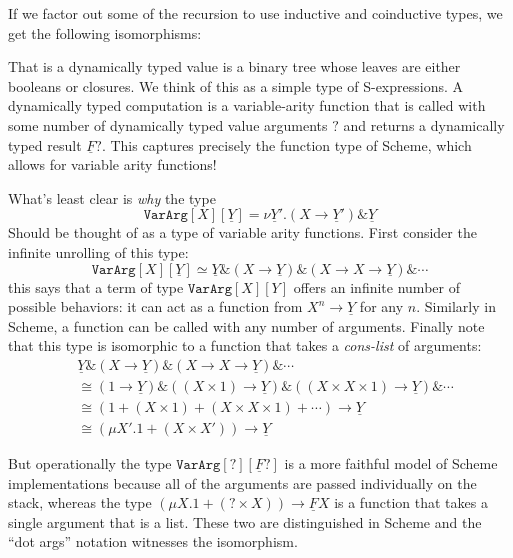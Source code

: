 \documentclass[acmsmall,nonacm]{acmart}
\renewcommand{\u}{\underline}
\newcommand{\dynv}{{?}}
\newcommand{\dync}{\u {\text{?`}}}
\newcommand{\with}{\mathbin{\&}}
\begin{document}
\begin{longonly}
If we factor out some of the recursion to use inductive and
coinductive types, we get the following isomorphisms:

That is a dynamically typed value is a binary tree whose leaves are
either booleans or closures.
%
We think of this as a simple type of S-expressions.
%
A dynamically typed computation is a variable-arity function that is
called with some number of dynamically typed value arguments $\dynv$
and returns a dynamically typed result $\u F \dynv$.
%
This captures precisely the function type of Scheme, which allows for
variable arity functions!

What's least clear is \emph{why} the type
\[
\texttt{VarArg}[X][\u Y] = \nu \u Y'. (X \to \u Y') \with \u Y
\]
Should be thought of as a type of variable arity functions.
%
First consider the infinite unrolling of this type:
\[
\texttt{VarArg}[X][\u Y] \simeq \u Y \with (X \to \u Y) \with (X \to X \to \u Y) \with \cdots
\]
this says that a term of type $\texttt{VarArg}[X][Y]$ offers an
infinite number of possible behaviors: it can act as a function from
$X^n \to \u Y$ for any $n$.
%
Similarly in Scheme, a function can be called with any number of
arguments.
%
Finally note that this type is isomorphic to a function that takes a
\emph{cons-list} of arguments:
\begin{align*}
  &\u Y \with (X \to \u Y) \with (X \to X \to \u Y) \with \cdots\\
  &\cong(1 \to \u Y) \with ((X \times 1) \to \u Y) \with ((X \times X \times 1) \to \u Y) \with \cdots\\
  &\cong(1 + (X \times 1) + (X \times X \times 1) + \cdots) \to \u Y\\
  &\cong(\mu X'. 1 + (X\times X')) \to \u Y
\end{align*}

But operationally the type $\texttt{VarArg}[\dynv][\u F\dynv]$ is a
more faithful model of Scheme implementations because all of the
arguments are passed individually on the stack, whereas the type $(\mu
X. 1 + (\dynv \times X)) \to \u F X$ is a function that takes a single
argument that is a list.
%
These two are distinguished in Scheme and the ``dot args'' notation
witnesses the isomorphism.
\end{longonly}
\end{document}
